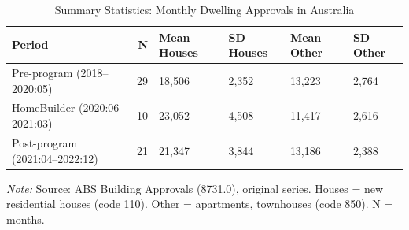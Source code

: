 \begin{table}[!h]
\centering
\caption{\label{tab:summary}Summary Statistics: Monthly Dwelling Approvals in Australia}
\small
\begin{tabular}[t]{lrllll}
\toprule
Period & N & Mean Houses & SD Houses & Mean Other & SD Other\\
\midrule
Pre-program (2018--2020:05) & 29 & 18,506 & 2,352 & 13,223 & 2,764\\
HomeBuilder (2020:06--2021:03) & 10 & 23,052 & 4,508 & 11,417 & 2,616\\
Post-program (2021:04--2022:12) & 21 & 21,347 & 3,844 & 13,186 & 2,388\\
\bottomrule
\end{tabular}

\vspace{0.3em}
{\footnotesize \textit{Note:} Source: ABS Building Approvals (8731.0), original series. Houses = new residential houses (code 110). Other = apartments, townhouses (code 850). N = months.}
\end{table}
